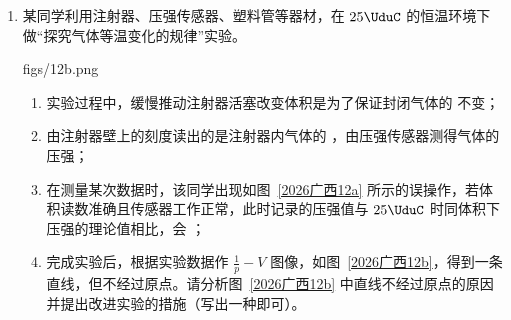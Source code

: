 \documentclass[\gkver]{gaokaozhenti}
\begin{document}
\begin{enumerate}


\item
某同学利用注射器、压强传感器、塑料管等器材，在 $25\UduC$ 的恒温环境下做“探究气体等温变化的规律”实验。

{figs/12b.png}

\begin{enumerate}
	\item
	实验过程中，缓慢推动注射器活塞改变体积是为了保证封闭气体的  不变；
	\item
	由注射器壁上的刻度读出的是注射器内气体的 ，由压强传感器测得气体的压强；
	\item
	在测量某次数据时，该同学出现如图~\ref{2026广西12a} 所示的误操作，若体积读数准确且传感器工作正常，此时记录的压强值与 $25\UduC$ 时同体积下压强的理论值相比，会 ；
	\item
	完成实验后，根据实验数据作 $\frac{1}{p}-V$ 图像，如图~\ref{2026广西12b}，得到一条直线，但不经过原点。请分析图~\ref{2026广西12b} 中直线不经过原点的原因并提出改进实验的措施（写出一种即可）。
\end{enumerate}


\end{enumerate}
\end{document}
